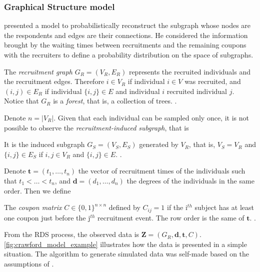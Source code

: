 \subsubsection{Graphical Structure model}

\textcite{crawford2016} presented a model to probabilistically reconstruct the
subgraph whose nodes are the respondents and edges are their connections. He
considered the information brought by the waiting times between recruitments
and the remaining coupons with the recruiters to define a probability
distribution on the space of subgraphs. 

\begin{definition}
  \label{def:recruitment-graph}
  The {\em recruitment graph} $G_R = (V_R, E_R)$ represents the recruited
  individuals and the recruitment edges. Therefore $i \in V_R$ if individual
  $i \in V$ was recruited, and $(i,j) \in E_R$ if individual $\{i,j\} \in E$ 
  and individual $i$ recruited individual $j$. Notice that $G_R$ is a {\em
  forest}, that is, a collection of trees. \cite[p. 193]{crawford2016}.
\end{definition}

Denote $n = |V_R|$. Given that each individual can be sampled only once, it is not possible to
observe the {\em recruitment-induced subgraph}, that is

\begin{definition}
  It is the induced subgraph $G_S = (V_S, E_S)$ generated by $V_R$, that is,
  $V_S = V_R$ and $\{i,j\} \in E_S$ if $i, j \in V_R$ and $\{i, j\} \in E$. 
  \cite[p. 192]{crawford2016}.
\end{definition}

Denote $\boldsymbol{t} = (t_1, \dots, t_n)$ the vector of recruitment times of
the individuals such that $t_1 < \dots < t_n$, and $\boldsymbol{d} = (d_1,
\dots, d_n)$ the degrees of the individuals in the same order. Then we define 

\begin{definition}
  The {\em coupon matrix} $C \in \{0,1\}^{n\times n}$ defined by $C_{ij} =
1$ if the i$^{th}$ subject has at least one coupon just before the j$^{th}$
recruitment event. The row order is the same of $\boldsymbol{t}$. \cite[p.
193]{crawford2016}. 
\end{definition}

From the RDS process, the observed data is $\boldsymbol{Z} = (G_R,
\boldsymbol{d}, \boldsymbol{t}, C)$. \autoref{fig:crawford_model_example}
illustrates how the data is presented in a simple situation. The algorithm to
generate simulated data was self-made based on the assumptions of
\textcite{crawford2016}.

